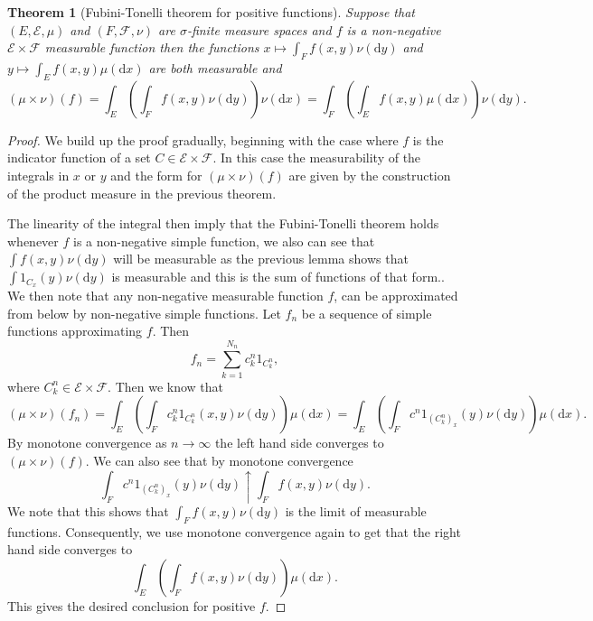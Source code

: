 \documentclass[11pt]{article}
\newtheorem{thm}{Theorem}[section]
\theoremstyle{definition}
\theoremstyle{remark}
\begin{document}
\begin{thm}[Fubini-Tonelli theorem for positive functions]
Suppose that $(E, \mathcal{E}, \mu)$ and $(F, \mathcal{F}, \nu)$ are $\sigma$-finite measure spaces and $f$ is a non-negative $\mathcal{E} \times \mathcal{F}$ measurable function then the functions $x \mapsto \int_F f(x,y) \nu(\mathrm{d}y)$ and $y \mapsto \int_E f(x,y) \mu(\mathrm{d}x)$ are both measurable and
\[(\mu \times \nu)(f) = \int_E \left( \int_F f(x,y) \nu(\mathrm{d}y) \right) \nu(\mathrm{d}x) = \int_F \left( \int_E f(x,y) \mu(\mathrm{d}x) \right) \nu(\mathrm{d}y). \]
\end{thm}
\begin{proof}
We build up the proof gradually, beginning with the case where $f$ is the indicator function of a set $C \in \mathcal{E} \times \mathcal{F}$. In this case the measurability of the integrals in $x$ or $y$ and the form for $(\mu \times \nu)(f)$ are given by the construction of the product measure in the previous theorem. 

The linearity of the integral then imply that the Fubini-Tonelli theorem holds whenever $f$ is a non-negative simple function, we also can see that $\int f(x,y) \nu(\mathrm{d}y)$ will be measurable as the previous lemma shows that $\int 1_{C_x}(y) \nu(\mathrm{d}y)$ is measurable and this is the sum of functions of that form.. We then note that any non-negative measurable function $f$, can be approximated from below by non-negative simple functions. Let $f_n$ be a sequence of simple functions approximating $f$. Then 
\[f_n = \sum_{k=1}^{N_n} c^n_k 1_{C^n_k}, \] where $C^n_k \in \mathcal{E} \times \mathcal{F}$. Then we know that
\[ (\mu \times \nu)(f_n) = \int_E \left( \int_F c^n_k 1_{C^n_k}(x,y) \nu(\mathrm{d}y) \right) \mu(\mathrm{d}x) = \int_E \left( \int_F c^n 1_{(C^n_k)_x}(y) \nu(\mathrm{d}y) \right)\mu(\mathrm{d}x). \] By monotone convergence as $n \rightarrow \infty$ the left hand side converges to $(\mu \times \nu)(f)$. We can also see that by monotone convergence
\[ \int_F c^n 1_{(C^n_k)_x}(y) \nu(\mathrm{d}y) \uparrow \int_F f(x,y) \nu(\mathrm{d}y). \] We note that this shows that $\int_F f(x,y) \nu(\mathrm{d}y)$ is the limit of measurable functions. Consequently, we use monotone convergence again to get that the right hand side converges to
\[ \int_E \left( \int_F f(x,y) \nu(\mathrm{d}y) \right) \mu(\mathrm{d}x). \] This gives the desired conclusion for positive $f$. 
\end{proof}
\end{document}
